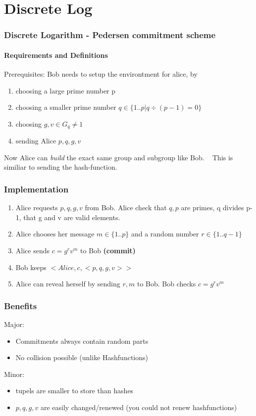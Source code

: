 \section{Discrete Log}
\begin{frame}
	\frametitle{Discrete Logarithm - Pedersen commitment scheme}
	\framesubtitle{Requirements and Definitions}
	Prerequisites: Bob needs to setup the environtment for alice, by 
	\begin{enumerate}
		\item choosing a large prime number p
		\item choosing a smaller prime number $q \in \{1..p| q\div (p-1) = 0\}$
		\item choosing $g,v \in G_q \neq 1$
		\item sending Alice $p,q,g,v$ 
	\end{enumerate}

	Now Alice can \textit{build} the exact same group and subgroup like Bob. ~\newline
	This is similiar to sending the hash-function.  
\end{frame}

\begin{frame}
	\frametitle{Implementation}
	\begin{enumerate}
		\item Alice requests $p,q,g,v$ from Bob. Alice check that $q,p$ are primes, q divides p-1, that g and v are valid elements. 
		\item Alice chooses her message $m \in \{1..p\}$ and a random number $r \in \{1..q-1\}$
		\item Alice sends $c = g^rv^m$ to Bob \textbf{(commit)}
		\item Bob keeps $<Alice,c,<p,q,g,v>>$
		\item Alice can reveal herself by sending $r,m$ to Bob. Bob checks $c = g^rv^m$
	\end{enumerate}
\end{frame}

\begin{frame}
	\frametitle{Benefits}
	Major:
	\begin{itemize}
		\item Commitments always contain random parts
		\item No collision possible (unlike Hashfunctions)	
	\end{itemize}
	Minor:
	\begin{itemize}
		\item tupels are smaller to store than hashes
		\item $p,q,g,v$ are easily changed/renewed (you could not renew hashfunctions)
	\end{itemize}
\end{frame}